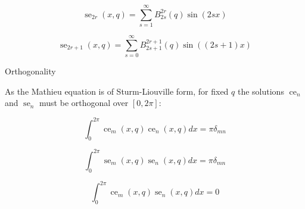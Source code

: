 \documentclass{article}
\DeclareMathOperator{\ce}{ce}
\DeclareMathOperator{\se}{se}
\begin{document}
\begin{equation}
    \se_{2r}(x, q) = \sum_{s=1}^{\infty}{B_{2s}^{2r}(q)\sin(2sx)}
\end{equation}

\begin{equation}
    \se_{2r+1}(x, q) = \sum_{s=0}^{\infty}{B_{2s+1}^{2r+1}(q)\sin((2s+1)x)}
\end{equation}

Orthogonality

As the Mathieu equation is of Sturm-Liouville form, for fixed $q$ the solutions $\ce_n$ and $\se_n$ must be orthogonal over $[0, 2\pi]$:

\begin{equation}
    \int_0^{2\pi}\ce_m(x, q)\ce_n(x, q)dx = \pi \delta_{mn}
\end{equation}

\begin{equation}
    \int_0^{2\pi}\se_m(x, q)\se_n(x, q)dx = \pi \delta_{mn}
\end{equation}

\begin{equation}
    \int_0^{2\pi}\ce_m(x, q)\se_n(x, q)dx = 0
\end{equation}
\end{document}
